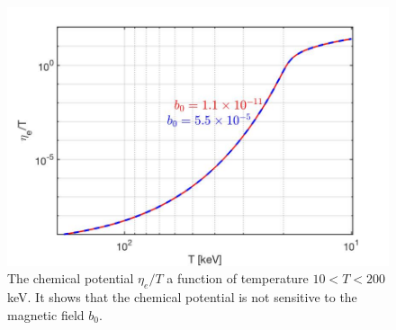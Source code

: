 \documentclass[universe,article,submit,moreauthors,pdftex,a4paper]{Definitions/mdpi}
\begin{document}
\begin{figure}[ht]
\centering
\includegraphics[width=\textwidth]{./plots/ChemicalPotentialFinal_200keV.jpg}
\caption{The chemical potential $\eta_{e}/T$ a function of temperature $10<T<200$ keV. It shows that the chemical potential is not sensitive to the magnetic field $b_0$.}
\label{chemical_fig} 
\end{figure}

\end{document}
